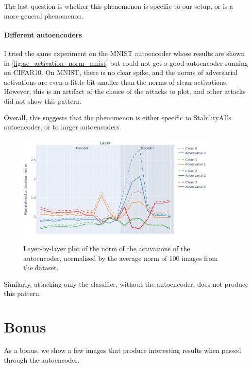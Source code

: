 \documentclass[]{scrarticle}
\begin{document}
The last question is whether this phenomenon is specific to
our setup, or is a more general phenomenon.

\paragraph{Different autoencoders}
I tried the same experiment on the MNIST autoencoder
whose results are shown in
\autoref{fig:ae_activation_norm_mnist}
but could not get a good autoencoder running on CIFAR10.
On MNIST, there is no clear spike, and the norms of adversarial
activations are even a little bit smaller than the norms of clean activations.
However, this is an artifact of the choice of the attacks to plot,
and other attacks did not show this pattern.

Overall, this suggests that the phenomenon is either specific
to StabilityAI's autoencoder, or to larger autoencoders.

\begin{figure}[h]
  \centering
  \includegraphics[width=0.9\textwidth]{images/ae_activation_norm_MNIST.png}
  \caption{
    Layer-by-layer plot of the norm of the activations of the autoencoder,
    normalised by the average norm of 100 images from the dataset.
  }
  \label{fig:ae_activation_norm_mnist}
\end{figure}


Similarly, attacking only the classifier, without the autoencoder,
does not produce this pattern.

\clearpage
\section*{Bonus}

As a bonus, we show a few images that produce interesting results when
passed through the autoencoder.
\end{document}
